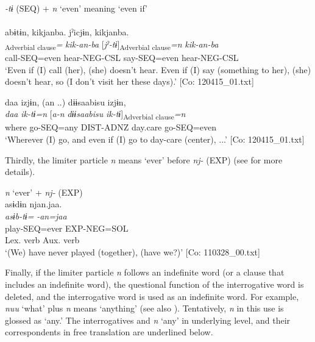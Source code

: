 \ea\label{ex:10.19}   \textit{{}-tɨ} (SEQ) + \textit{n} ‘even’ meaning ‘even if’\\
  \ea\relax  [= (8-103)]\\
      \glll    abɨtɨn,  kikjanba.  jˀicjɨn,  kikjanba.\\
      [\textit{abɨr-tɨ}]\textsubscript{Adverbial clause}\textit{=}  \textit{kik-an-ba}  [\textit{jˀ-tɨ}]\textsubscript{Adverbial clause}\textit{=n}  \textit{kik-an-ba}\\
      call-SEQ=even  hear{}-NEG-CSL  say-SEQ=even  hear{}-NEG-CSL\\
      \glt       ‘Even if (I) call (her), (she) doesn’t hear. Even if (I) say (something to her), (she) doesn’t hear, so (I don’t visit her these days).’ [Co: 120415\_01.txt]

  \ex  %
      \glll    daa  izjɨn,  {(an ..)}  {\textbar}dɨɨsaabisu{\textbar}  izjɨn,\\
      \textit{daa}  \textit{ik-tɨ=n}  [\textit{a-n}  \textit{dɨɨsaabisu}  \textit{ik-tɨ}]\textsubscript{Adverbial clause}\textit{=n}\\
      where  go-SEQ=any  DIST-ADNZ  day.care  go-SEQ=even\\
      \glt       ‘Wherever (I) go, and even if (I) go to day-care (center), ...’ [Co: 120415\_01.txt]
    \z
\z

Thirdly, the limiter particle \textit{n} means ‘ever’ before \textit{nj-} (EXP) (see  for more details).

\ea\label{ex:10.20}   \textit{n} ‘ever’ + \textit{nj-} (EXP)\\
  \gllll    asɨdɨn  njan.jaa.\\
    \textit{asɨb-tɨ=}  \textit{-an=jaa}\\
    play-SEQ=ever  EXP-NEG=SOL\\
    {Lex. verb}  {Aux. verb}\\
   \glt ‘(We) have never played (together), (have we?)’ [Co: 110328\_00.txt]
\z

  Finally, if the limiter particle \textit{n} follows an indefinite word (or a clause that includes an indefinite word), the questional function of the interrogative word is deleted, and the interrogative word is used as an indefinite word. For example, \textit{nuu} ‘what’ plus \textit{n} means ‘anything’ (see also ). Tentatively, \textit{n} in this use is glossed as ‘any.’ The interrogatives and \textit{n} ‘any’ in underlying level, and their correspondents in free translation are underlined below.

